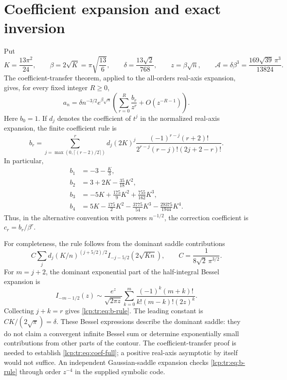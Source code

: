 \documentclass[11pt]{article}
\numberwithin{equation}{section}
\theoremstyle{definition}\newtheorem{definition}[theorem]{Definition}
\theoremstyle{remark}\newtheorem{remark}[theorem]{Remark}
\begin{document}
\section{Coefficient expansion and exact inversion}\label{lcp:tr:sec:inverse}
Put
\[
 K=\frac{13\pi^2}{24},\qquad \beta=2\sqrt K=\pi\sqrt{\frac{13}{6}},
 \qquad \delta=\frac{13\sqrt2}{768},\qquad z=\beta\sqrt n,
 \qquad \mathcal A=\delta\beta^3=\frac{169\sqrt{39}\,\pi^3}{13824}.
\]
The coefficient-transfer theorem, applied to the all-orders real-axis expansion,
gives, for every fixed integer $R\ge0$,
\begin{equation}\label{lcp:tr:eq:coef-full}
 a_n=\delta n^{-3/2}e^{\beta\sqrt n}
 \left(\sum_{r=0}^{R}\frac{b_r}{z^r}+O(z^{-R-1})\right).
\end{equation}
Here $b_0=1$.  If $d_j$ denotes the coefficient of $t^j$ in the normalized
real-axis expansion, the finite coefficient rule is
\begin{equation}\label{lcp:tr:eq:b-rule}
 b_r=\sum_{j=\max(0,\lceil(r-2)/2\rceil)}^r
 d_j(2K)^j\frac{(-1)^{r-j}(r+2)!}
 {2^{r-j}(r-j)!(2j+2-r)!}.
\end{equation}
In particular,
\begin{align*}
 b_1&=-3-\frac K3,\\
 b_2&=3+2K-\frac{35}{18}K^2,\\
 b_3&=-5K+\frac{175}{9}K^2+\frac{755}{162}K^3,\\
 b_4&=5K-\frac{175}{2}K^2-\frac{3775}{54}K^3
             -\frac{29375}{1944}K^4.
\end{align*}
Thus, in the alternative convention with powers $n^{-1/2}$, the correction
coefficient is $c_r=b_r/\beta^r$.

For completeness, the rule follows from the dominant saddle contributions
\[
 C\sum_j d_j(K/n)^{(j+5/2)/2}I_{-j-5/2}(2\sqrt{Kn}),
 \qquad C=\frac1{8\sqrt2\,\pi^{3/2}}.
\]
For $m=j+2$, the dominant exponential part of the half-integral Bessel expansion is
\[
 I_{-m-1/2}(z)\sim \frac{e^z}{\sqrt{2\pi z}}
 \sum_{k=0}^{m}\frac{(-1)^k(m+k)!}{k!(m-k)!(2z)^k}.
\]
Collecting $j+k=r$ gives \eqref{lcp:tr:eq:b-rule}. The leading constant is
$CK/(2\sqrt\pi)=\delta$. These Bessel expressions describe the dominant saddle:
they do not claim a convergent infinite Bessel sum or determine exponentially
small contributions from other parts of the contour.  The coefficient-transfer
proof is needed to establish \eqref{lcp:tr:eq:coef-full}; a positive real-axis asymptotic
by itself would not suffice. An independent Gaussian-saddle expansion checks
\eqref{lcp:tr:eq:b-rule} through order $z^{-4}$ in the supplied symbolic code.
\end{document}
